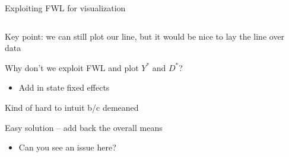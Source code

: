 \documentclass[notes,11pt, aspectratio=169]{beamer}
\newenvironment{wideitemize}{\itemize\addtolength{\itemsep}{10pt}}{\enditemize}
\begin{document}
\begin{frame}{Exploiting FWL for visualization}
  \begin{columns}[T] %
    \begin{column}{.5\textwidth}
  \begin{wideitemize}
  \item<1-> Key point: we can still plot our line, but it would be nice to
    lay the line over data
  \item<1-> Why don't we exploit FWL and plot $Y^{*}$ and  $D^{*}$?
    \begin{itemize}
    \item Add in state fixed effects
    \end{itemize}
  \item<1-> Kind of hard to intuit b/c demeaned
  \item<2-> Easy solution -- add back the overall means
    \begin{itemize}
    \item Can you see an issue here?
    \end{itemize}
  \end{wideitemize}
  \end{column}%
  \hfill%
  \begin{column}{.5\textwidth}
\end{column}
\end{columns}
\end{frame}
\end{document}
